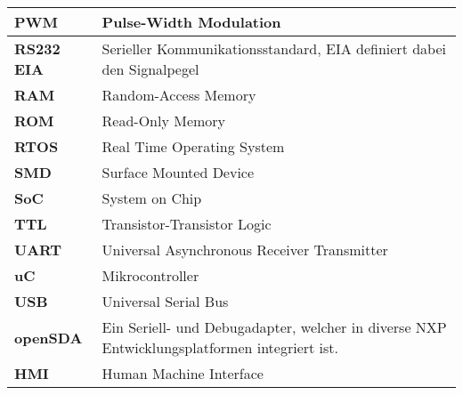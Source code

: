 \begin{table}[H]
\begin{tabular}{|L{3cm}|L{12.3cm}|}
		\hline
		\textbf{PWM} & Pulse-Width Modulation\\
		
		\hline
		\textbf{RS232 EIA} & Serieller Kommunikationsstandard, EIA definiert dabei den Signalpegel\\
		
		\hline
		\textbf{RAM} & Random-Access Memory \\
		
		\hline
		\textbf{ROM} & Read-Only Memory \\
		
		\hline
		\textbf{RTOS} & Real Time Operating System \\
		
		\hline
		\textbf{SMD} &	Surface Mounted Device\\
		
		\hline
		\textbf{SoC} &	System on Chip\\
			
		\hline
		\textbf{TTL} &	Transistor-Transistor Logic\\	
				
		\hline
		\textbf{UART} &	Universal Asynchronous Receiver Transmitter\\
		
		\hline
		\textbf{uC} &	Mikrocontroller\\
		
		\hline
		\textbf{USB} &	Universal Serial Bus\\		
		
		\hline
		\textbf{openSDA} & Ein Seriell- und Debugadapter, welcher in diverse NXP Entwicklungsplatformen integriert ist.\\
		
		\hline
		\textbf{HMI} & Human Machine Interface\\
				
		\hline
	\end{tabular} 
\end{table}



